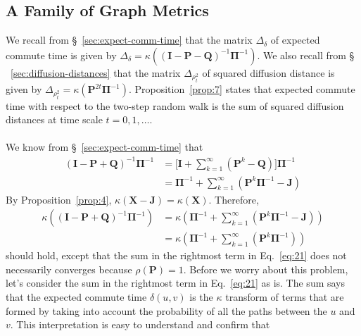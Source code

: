 \documentclass[10pt,twocolumn]{article}
\numberwithin{equation}{section}
\begin{document}
\subsection{A Family of Graph Metrics}
\label{general_graph_metrics}
We recall from \S ~\ref{sec:expect-comm-time} that the matrix
$\Delta_{\delta}$ of expected commute time is given by
$\Delta_{\delta} = \kappa((\mathbf{I} - \mathbf{P} -
\mathbf{Q})^{-1}\bm{\Pi}^{-1})$. We also recall from \S
~\ref{sec:diffusion-distances} that the matrix $\Delta_{\rho_{t}^{2}}$
of squared diffusion distance is given by $\Delta_{\rho_{t}^{2}} =
\kappa(\mathbf{P}^{2t}\bm{\Pi}^{-1})$. Proposition~\ref{prop:7}
states that expected commute time with respect to the two-step random
walk is the sum of squared diffusion distances at time scale
$t=0,1,\dots$. \\
\\
\noindent
We know from \S~\ref{sec:expect-comm-time} that
\begin{equation}
  \label{eq:20}
  \begin{split}
    (\mathbf{I} - \mathbf{P} + \mathbf{Q})^{-1}\bm{\Pi}^{-1} &=
    \biggl[\mathbf{I} + \sum_{k=1}^{\infty}{(\mathbf{P}^{k} -
      \mathbf{Q})}\biggr]\bm{\Pi}^{-1} \\
    & = \bm{\Pi}^{-1} +
    \sum_{k=1}^{\infty}{(\mathbf{P}^{k}\bm{\Pi}^{-1} - \mathbf{J})}
  \end{split}
\end{equation}
By Proposition~\ref{prop:4}, $\kappa(\mathbf{X} -
\mathbf{J}) = \kappa(\mathbf{X})$. Therefore,
\begin{equation}
  \label{eq:21}
  \begin{split}
    \kappa((\mathbf{I} - \mathbf{P} + \mathbf{Q})^{-1}\bm{\Pi}^{-1})
    &= \kappa(\bm{\Pi}^{-1} +
    \sum_{k=1}^{\infty}{(\mathbf{P}^{k}\bm{\Pi}^{-1} - \mathbf{J})}) \\
    &= \kappa(\bm{\Pi}^{-1} +
    \sum_{k=1}^{\infty}{(\mathbf{P}^{k}\bm{\Pi}^{-1})})
  \end{split}
\end{equation}
should hold, except that the sum in the rightmost term in
Eq.~\eqref{eq:21} does not necessarily converges because 
$\rho(\mathbf{P}) = 1$. Before we worry about this problem, let's
consider the sum in the rightmost term in Eq.~\eqref{eq:21} as is. The sum
says that the expected commute time $\delta(u,v)$ is the
$\kappa$ transform of terms that are formed by taking into account the
probability of all the paths between the $u$ and $v$. This
interpretation is easy to understand and confirm that
\end{document}
